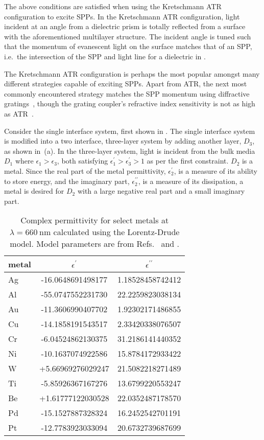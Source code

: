 The above conditions are satisfied when using the Kretschmann ATR
configuration to excite SPPs.  In the Kretschmann ATR configuration, light
incident at an angle from a dielectric prism is totally reflected from a
surface with the aforementioned multilayer structure.  The incident angle
is tuned such that the momentum of evanescent light on the surface matches
that of an SPP, i.e.\ the intersection of the SPP and light line
for a dielectric in .

The Kretschmann ATR configuration is perhaps the most popular amongst many
different strategies capable of exciting SPPs.  Apart from ATR, the next
most commonly encountered strategy matches the SPP momentum using
diffractive gratings~\cite{homola1999surface}, though the grating coupler's
refractive index sensitivity is not as high as
ATR~\cite{homola1999senscomparison}.

Consider the single interface system, first shown in
.  The single interface system is modified
into a two interface, three-layer system by adding another layer, $D_3$, as
shown in \,(a).  In the three-layer system,
light is incident from the bulk media $D_1$ where $\epsilon_1>\epsilon_3$,
both satisfying $\epsilon^\prime_1>\epsilon^\prime_3>1$ as per the first
constraint.  $D_2$ is a metal.  Since the real part of the metal
permittivity, $\epsilon_2^\prime$, is a measure of its ability to store
energy, and the imaginary part, $\epsilon_2^{\prime\prime}$, is a measure of
its dissipation, a metal is desired for $D_2$ with a large negative real
part and a small imaginary part.
\begin{table}[ht]
\centering
{}
\begin{tabular}{lSS}
\toprule
metal & {$\epsilon^\prime$} & {$\epsilon^{\prime\prime}$} \\
\midrule
Ag & -16.0648691498177 & 1.18528458742412\\
Al & -55.0747552231730 & 22.2259823038134\\
Au & -11.3606990407702 & 1.92302171486855\\
Cu & -14.1858191543517 & 2.33420338076507\\
Cr & -6.04524862130375 & 31.2186141440352\\
Ni & -10.1637074922586 & 15.8784172933422\\
W  & +5.66969276029247 & 21.5082218271489\\
Ti & -5.85926367167276 & 13.6799220553247\\
Be & +1.61777122030528 & 22.0352487178570\\
Pd & -15.1527887328324 & 16.2452542701191\\
Pt & -12.7783923033094 & 20.6732739687699\\
\bottomrule
\end{tabular}
\caption{Complex permittivity for select metals at
$\lambda=\SI{660}{\nano\meter}$ calculated using the Lorentz-Drude
model.  Model parameters are from Refs.~\cite{ung2007interference} and
\cite{rakic1998optical}.}
\label{tbl:epsmetal600}
\end{table}

